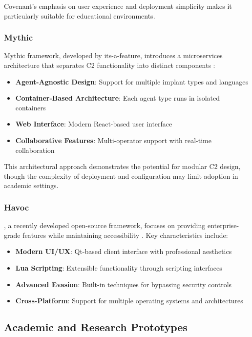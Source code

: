 Covenant's emphasis on user experience and deployment simplicity makes it particularly suitable for educational environments.

\subsubsection{Mythic}

Mythic framework, developed by its-a-feature, introduces a microservices architecture that separates C2 functionality into distinct components \cite{mythic2021framework}:

\begin{itemize}
\item \textbf{Agent-Agnostic Design}: Support for multiple implant types and languages
\item \textbf{Container-Based Architecture}: Each agent type runs in isolated containers
\item \textbf{Web Interface}: Modern React-based user interface
\item \textbf{Collaborative Features}: Multi-operator support with real-time collaboration
\end{itemize}

This architectural approach demonstrates the potential for modular C2 design, though the complexity of deployment and configuration may limit adoption in academic settings.

\subsubsection{Havoc}

, a recently developed open-source framework, focuses on providing enterprise-grade features while maintaining accessibility \cite{havoc2022framework}. Key characteristics include:

\begin{itemize}
\item \textbf{Modern UI/UX}: Qt-based client interface with professional aesthetics
\item \textbf{Lua Scripting}: Extensible functionality through scripting interfaces
\item \textbf{Advanced Evasion}: Built-in techniques for bypassing security controls
\item \textbf{Cross-Platform}: Support for multiple operating systems and architectures
\end{itemize}

\subsection{Academic and Research Prototypes}
\label{subsec:academic_solutions}

